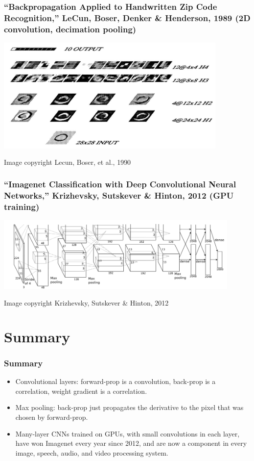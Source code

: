 \documentclass{beamer}
\begin{document}
\begin{frame}
  \frametitle{``Backpropagation Applied to Handwritten Zip Code
    Recognition,'' LeCun, Boser, Denker \& Henderson, 1989 (2D
    convolution, decimation pooling)}
  \centerline{\includegraphics[width=4.5in]{figs/lecun1990.png}}
  \begin{tiny}Image copyright Lecun, Boser, et al., 1990\end{tiny}
\end{frame}

\begin{frame}
  \frametitle{``Imagenet Classification with Deep Convolutional Neural
    Networks,'' Krizhevsky, Sutskever \& Hinton, 2012 (GPU training)}
  \centerline{\includegraphics[width=4.75in]{figs/krizhevsky2012.png}}
  \begin{tiny}Image copyright Krizhevsky, Sutskever \& Hinton, 2012\end{tiny}
\end{frame}


\section{Summary}
\setcounter{subsection}{1}

\begin{frame}
  \frametitle{Summary}
  \begin{itemize}
  \item Convolutional layers: forward-prop is a convolution, back-prop
    is a correlation, weight gradient is a correlation.
  \item Max pooling: back-prop just propagates the derivative to the
    pixel that was chosen by forward-prop.
  \item Many-layer CNNs trained on GPUs, with small convolutions in
    each layer, have won Imagenet every year since 2012, and are now a
    component in every image, speech, audio, and video processing
    system.
  \end{itemize}
\end{frame}
\end{document}

